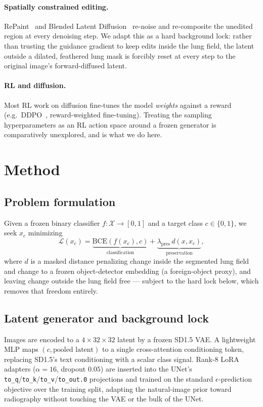 \documentclass[10pt,twocolumn,letterpaper]{article}
\begin{document}
\paragraph{Spatially constrained editing.} RePaint~\cite{repaint} and
Blended Latent Diffusion~\cite{blended} re-noise and re-composite the
unedited region at every denoising step. We adapt this as a hard
background lock: rather than trusting the guidance gradient to keep edits
inside the lung field, the latent outside a dilated, feathered lung mask
is forcibly reset at every step to the original image's forward-diffused
latent.

\paragraph{RL and diffusion.} Most RL work on diffusion fine-tunes the
model \emph{weights} against a reward (e.g.\ DDPO~\cite{black2024ddpo},
reward-weighted fine-tuning). Treating the sampling hyperparameters as an
RL action space around a frozen generator is comparatively unexplored,
and is what we do here.

\section{Method}
\label{sec:method}

\subsection{Problem formulation}
Given a frozen binary classifier $f:\mathcal{X}\to[0,1]$ and a target
class $c\in\{0,1\}$, we seek $x_c$ minimizing
\begin{equation}
\mathcal{L}(x_c) = \underbrace{\mathrm{BCE}(f(x_c),c)}_{\text{classification}}
+ \underbrace{\lambda_{\text{pres}}\,d(x,x_c)}_{\text{preservation}},
\label{eq:objective}
\end{equation}
where $d$ is a masked distance penalizing change inside the segmented
lung field and change to a frozen object-detector embedding (a
foreign-object proxy), and leaving change outside the lung field free ---
subject to the hard lock below, which removes that freedom entirely.

\subsection{Latent generator and background lock}
Images are encoded to a $4\times32\times32$ latent by a frozen SD1.5 VAE.
A lightweight MLP maps $(c, \text{pooled latent})$ to a single
cross-attention conditioning token, replacing SD1.5's text conditioning
with a scalar class signal. Rank-8 LoRA adapters ($\alpha=16$, dropout
$0.05$) are inserted into the UNet's \texttt{to\_q}/\texttt{to\_k}/\texttt{to\_v}/\texttt{to\_out.0}
projections and trained on the standard $\epsilon$-prediction objective
over the training split, adapting the natural-image prior toward
radiography without touching the VAE or the bulk of the UNet.
\end{document}
